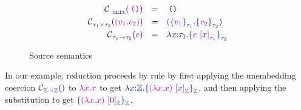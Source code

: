 \begin{figure}
%
\vspace{0.05cm}
\[
\begin{array}{r l l}
  \scoerce{\stunit}{}{\tunit} & = & \sunit

\\[0.3em]

  \scoerce{\sprod{\staui}{\stauii}}{\relax}{\tpair{\tvali}{\tvalii}} & = &
  \spair{\salien{\tvali}{\staui}{\relax}}{\salien{\tvalii}{\stauii}{\relax}}

\\[0.3em]

  \scoerce{\sarrow{\staui}{\stauii}}{\relax}{\texp} & = &
  \sabs{\svar{x}}{\staui}{\salien{\tapp{\texp}{\talien{\svar{x}}\staui\relax}}{\stauii}{\relax}}
\end{array}
\]
    \caption{Source semantics}
    \label{fig:sourceseman}
\end{figure}

In our example, reduction proceeds by rule {} by first
applying the unembedding coercion
$\scoerce{\source{\mathbb{Z} -> \mathbb{Z}}}{}{}$ to $\tabs{\tvar{x}}{\tvar{x}}$ to get
$\sabs{\svar{x}}{\mathbb{\source{Z}}}{\salien{\tapp{\target{(}\tabs{\tvar{x}}{\tvar{x}}\target{)}}{\talien{\svar{x}}{\mathbb{\source{Z}}}{}}}{\mathbb{\source{Z}}}{}}$,
and then applying the substitution to get
$\salien{\tapp{\target{(}\tabs{\tvar{x}}{\tvar{x}}\target{)}}{\talien{\source{0}}{\mathbb{\source{Z}}}{}}}{\mathbb{\source{Z}}}{}$.

